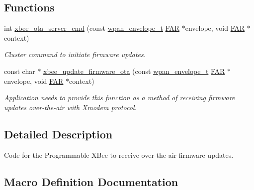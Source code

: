 \subsection*{Functions}
\begin{DoxyCompactItemize}
\item 
int \hyperlink{group__xbee__ota__server_ga22cb77be06faba4020a4f5e0daf48f4f}{xbee\+\_\+ota\+\_\+server\+\_\+cmd} (const \hyperlink{structwpan__envelope__t}{wpan\+\_\+envelope\+\_\+t} \hyperlink{group__hal_gaef060b3456fdcc093a7210a762d5f2ed}{F\+AR} $\ast$envelope, void \hyperlink{group__hal_gaef060b3456fdcc093a7210a762d5f2ed}{F\+AR} $\ast$context)
\begin{DoxyCompactList}\small\item\em Cluster command to initiate firmware updates. \end{DoxyCompactList}\item 
const char $\ast$ \hyperlink{group__xbee__ota__server_ga38fdff5e9fec8c3aa8bfd167621ee35c}{xbee\+\_\+update\+\_\+firmware\+\_\+ota} (const \hyperlink{structwpan__envelope__t}{wpan\+\_\+envelope\+\_\+t} \hyperlink{group__hal_gaef060b3456fdcc093a7210a762d5f2ed}{F\+AR} $\ast$envelope, void \hyperlink{group__hal_gaef060b3456fdcc093a7210a762d5f2ed}{F\+AR} $\ast$context)
\begin{DoxyCompactList}\small\item\em Application needs to provide this function as a method of receiving firmware updates over-\/the-\/air with Xmodem protocol. \end{DoxyCompactList}\end{DoxyCompactItemize}


\subsection{Detailed Description}
\begin{DoxyVerb}     Code for the Programmable XBee to receive over-the-air firmware
     updates.\end{DoxyVerb}
 



\subsection{Macro Definition Documentation}
\mbox{\label{group__xbee__ota__server_gacdc427d19ad192bd817194a74a8d7b08}} 
